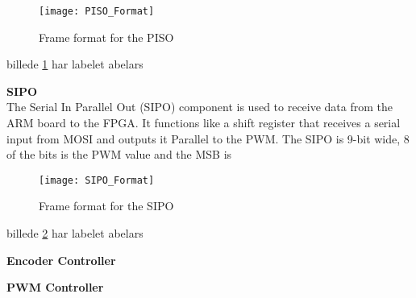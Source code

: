 \begin{figure}[h]
	\centering
	\texttt{[image: PISO\_Format]}
	\caption{Frame format for the PISO}
	\label{PISO_Format}
\end{figure}

billede \ref{PISO_Format} har labelet abelars

\textbf{SIPO}\\
The Serial In Parallel Out (SIPO) component is used to receive data from the ARM board to the FPGA. It functions like a shift register that receives a serial input from MOSI and outputs it Parallel to the PWM. The SIPO is 9-bit wide, 8 of the bits is the PWM value and the MSB is 

\begin{figure}[h]
	\centering
	\texttt{[image: SIPO\_Format]}
	\caption{Frame format for the SIPO}
	\label{SIPO_Format}
\end{figure}

billede \ref{SIPO_Format} har labelet abelars


\textbf{Encoder Controller}

\textbf{PWM Controller}